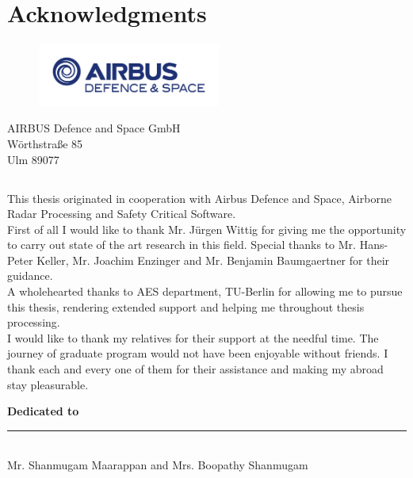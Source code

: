 \chapter*{Acknowledgments}
\label{chap:ack}

\begin{center}

	\begin{figure}[h!]
	\centering
	\includegraphics[width=60mm]{figures/AIRBUS_DS_Flat_RGB}
	\end{figure}
	
	AIRBUS Defence and Space GmbH\\
	W{\"o}rthstra{\ss}e 85 \\
	Ulm 89077 \\

\end{center}

\section*{}
This thesis originated in cooperation with Airbus Defence and Space, Airborne Radar Processing and Safety Critical Software. \\

First of all I would like to thank Mr. J{\"u}rgen Wittig for giving me the opportunity to carry out state of the art research in this field. Special thanks to Mr. Hans-Peter Keller, Mr. Joachim Enzinger and Mr. Benjamin Baumgaertner for their guidance. \\

A wholehearted thanks to AES department, TU-Berlin for allowing me to pursue this thesis, rendering extended support and helping me throughout thesis processing. \\

I would like to thank my relatives for their support at the needful time. The journey of graduate program would not have been enjoyable without friends. I thank each and every one of them for their assistance and making my abroad stay pleasurable.

\clearpage
\textbf{\LARGE{Dedicated to}} \\
\rule{\textwidth}{1pt}
~\\
Mr. Shanmugam Maarappan and Mrs. Boopathy Shanmugam